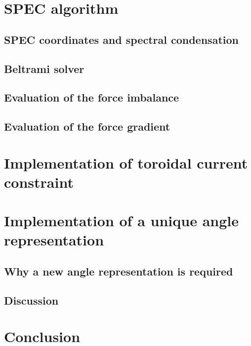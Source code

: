 \documentclass[my_thesis.tex]{subfiles}
\begin{document}
\section{SPEC algorithm \label{sec. spec_algorithm}} 




\subsection{SPEC coordinates and spectral condensation}
\subsection{Beltrami solver}
\subsection{Evaluation of the force imbalance}
\subsection{Evaluation of the force gradient}


\section{Implementation of toroidal current constraint \label{sec. current constraint}}




\section{Implementation of a unique angle representation \label{sec. angle representation}}

\subsection{Why a new angle representation is required}



\subsection{Discussion }


\section{Conclusion \label{sec. chap3 - conclusion}}
\end{document}
